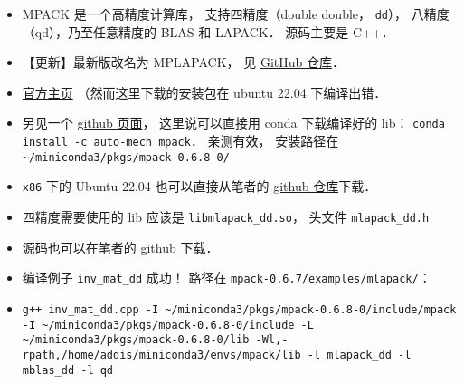 
\begin{issues}
\issueDraft
\end{issues}

\begin{itemize}
\item MPACK 是一个高精度计算库， 支持四精度（double double， \verb|dd|）， 八精度（qd），乃至任意精度的 BLAS 和 LAPACK． 源码主要是 C++．
\item 【更新】最新版改名为 MPLAPACK， 见 \href{https://github.com/nakatamaho/mplapack}{GitHub 仓库}．
\item \href{https://mplapack.sourceforge.net/}{官方主页} （然而这里下载的安装包在 ubuntu 22.04 下编译出错．
\item 另见一个 \href{https://github.com/Auto-Mech/MPACK}{github 页面}， 这里说可以直接用 conda 下载编译好的 lib： \verb|conda install -c auto-mech mpack|． 亲测有效， 安装路径在 \verb|~/miniconda3/pkgs/mpack-0.6.8-0/|
\item \verb|x86| 下的 Ubuntu 22.04 也可以直接从笔者的 \href{https://github.com/MacroUniverse/MPACK-source}{github 仓库}下载．
\item 四精度需要使用的 lib 应该是 \verb|libmlapack_dd.so|， 头文件 \verb|mlapack_dd.h|
\item 源码也可以在笔者的 \href{https://github.com/MacroUniverse/MPACK-source}{github} 下载．
\item 编译例子 \verb|inv_mat_dd| 成功！ 路径在 \verb|mpack-0.6.7/examples/mlapack/|：
\item \verb|g++ inv_mat_dd.cpp -I ~/miniconda3/pkgs/mpack-0.6.8-0/include/mpack -I ~/miniconda3/pkgs/mpack-0.6.8-0/include -L ~/miniconda3/pkgs/mpack-0.6.8-0/lib -Wl,-rpath,/home/addis/miniconda3/envs/mpack/lib -l mlapack_dd -l mblas_dd -l qd|
\end{itemize}

